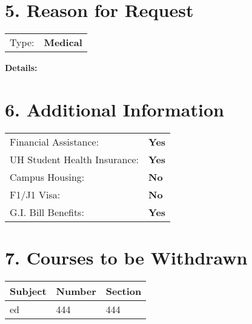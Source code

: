 \documentclass[12pt]{article}
\begin{document}
\vspace{0.5cm}

\section*{5. Reason for Request}
\begin{tabular}{ll}
Type: & \textbf{Medical} \\
\end{tabular}

\noindent\textbf{Details:}\\

\vspace{0.5cm}

\section*{6. Additional Information}
\begin{tabular}{ll}
Financial Assistance: & \textbf{Yes} \\
UH Student Health Insurance: & \textbf{Yes} \\
Campus Housing: & \textbf{No} \\
F1/J1 Visa: & \textbf{No} \\
G.I. Bill Benefits: & \textbf{Yes} \\
\end{tabular}

\vspace{0.5cm}

\section*{7. Courses to be Withdrawn}
\begin{tabular}{lll}
\textbf{Subject} & \textbf{Number} & \textbf{Section} \\
\hline
ed & 444 & 444 \\

\end{tabular}

\vspace{0.5cm}
\end{document}
